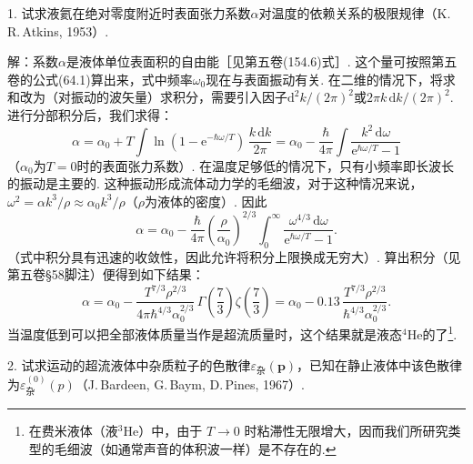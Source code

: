 \begin{xiti}

1. 试求液氦在绝对零度附近时表面张力系数$\alpha$对温度的依赖关系的极限规律（K.\,R.\,Atkins, 1953）.

{\heiti 解：}系数$\alpha$是液体单位表面积的自由能［见第五卷(154.6)式］. 这个量可按照第五卷的公式(64.1)算出来，式中频率$\omega_{0}$现在与表面振动有关. 在二维的情况下，将求和改为（对振动的波矢量）求积分，需要引入因子$\mathrm{d}^{2}k/(2\pi)^{2}$或$2\pi k\,\mathrm{d}k/(2\pi)^{2}$. 进行分部积分后，我们求得：
\begin{equation*}
\alpha=\alpha_{0}+T\int\ln(1-\mathrm{e}^{-\hbar\omega/T})\,\frac{k\,\mathrm{d}k}{2\pi}
=\alpha_{0}-\frac{\hbar}{4\pi}\int\frac{k^{2}\,\mathrm{d}\omega}{\mathrm{e}^{\hbar\omega/T}-1}
\end{equation*}
（$\alpha_{0}$为$T=0$时的表面张力系数）. 在温度足够低的情况下，只有小频率即长波长的振动是主要的. 这种振动形成流体动力学的毛细波，对于这种情况来说，$\omega^{2}=\alpha k^{3}/\rho\approx\alpha_{0}k^{3}/\rho$（$\rho$为液体的密度）. 因此
\begin{equation*}
\alpha=\alpha_{0}-\frac{\hbar}{4\pi}\left(\frac{\rho}{\alpha_{0}}\right)^{2/3}\int_{0}^{\infty}\frac{\omega^{4/3}\,\mathrm{d}\omega}{\mathrm{e}^{\hbar\omega/T}-1}.
\end{equation*}
（式中积分具有迅速的收敛性，因此允许将积分上限换成无穷大）. 算出积分（见第五卷§58脚注）便得到如下结果：
\begin{equation*}
\alpha=\alpha_{0}-\frac{T^{7/3}\rho^{2/3}}{4\pi\hbar^{4/3}\alpha_{0}^{2/3}}\,
\Gamma\!\left(\frac{7}{3}\right)\zeta\!\left(\frac{7}{3}\right)
=\alpha_{0}-0.13\,\frac{T^{7/3}\rho^{2/3}}{\hbar^{4/3}\alpha_{0}^{2/3}}.
\end{equation*}
当温度低到可以把全部液体质量当作是超流质量时，这个结果就是液态$^{4}\mathrm{He}$的了\footnote{在费米液体（液$^{3}$He）中，由于 $T\to 0$ 时粘滞性无限增大，因而我们所研究类型的毛细波（如通常声音的体积波一样）是不存在的.}.

2. 试求运动的超流液体中杂质粒子的色散律$\varepsilon_{\text{杂}}(\bm{p})$，已知在静止液体中该色散律为$\varepsilon^{(0)}_{\text{杂}}(p)$（J.\,Bardeen, G.\,Baym, D.\,Pines, 1967）.


\end{xiti}
